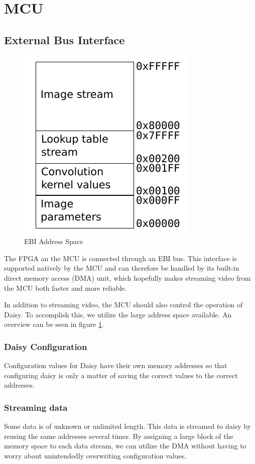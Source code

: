 \section{MCU}

\subsection{External Bus Interface}
\begin{figure}
    \centering
    \includegraphics[]{img/EbiAddressSpace.pdf}
    \caption{EBI Address Space}
    \label{fig:EbiAddressSpace}
\end{figure}
The FPGA an the MCU is connected through an EBI bus.
This interface is supported natively by the MCU and can therefore be handled by its built-in direct memory access (DMA) unit, which hopefully makes streaming video from the MCU both faster and more reliable.

In addition to streaming video, the MCU should also control the operation of Daisy.
To accomplish this, we utilize the large address space available.
An overview can be seen in figure \ref{fig:EbiAddressSpace}.

\subsubsection{Daisy Configuration}
Configuration values for Daisy have their own memory addresses so that configuring daisy is only a matter of saving the correct values to the correct addresses.

\subsubsection{Streaming data}
Some data is of unknown or unlimited length. This data is streamed to daisy by reusing the same addresses several times.
By assigning a large block of the memory space to each data stream, we can utilize the DMA without having to worry about unintendedly overwriting configuration values.

